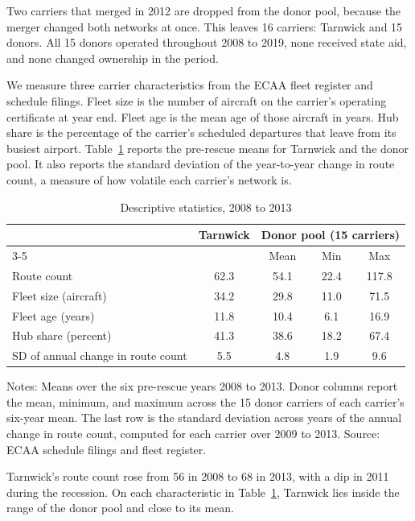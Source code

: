 \documentclass[12pt]{article}
\begin{document}
Two carriers that merged in 2012 are dropped from the donor pool, because the merger changed both networks at once. This leaves 16 carriers: Tarnwick and 15 donors. All 15 donors operated throughout 2008 to 2019, none received state aid, and none changed ownership in the period.

We measure three carrier characteristics from the ECAA fleet register and schedule filings. Fleet size is the number of aircraft on the carrier's operating certificate at year end. Fleet age is the mean age of those aircraft in years. Hub share is the percentage of the carrier's scheduled departures that leave from its busiest airport. Table~\ref{tab:desc} reports the pre-rescue means for Tarnwick and the donor pool. It also reports the standard deviation of the year-to-year change in route count, a measure of how volatile each carrier's network is.

\begin{table}[ht]
\centering
\begin{threeparttable}
\caption{Descriptive statistics, 2008 to 2013}
\label{tab:desc}
\begin{tabular}{lcccc}
\toprule
 & Tarnwick & \multicolumn{3}{c}{Donor pool (15 carriers)} \\
\cmidrule(lr){3-5}
 & & Mean & Min & Max \\
\midrule
Route count & 62.3 & 54.1 & 22.4 & 117.8 \\
Fleet size (aircraft) & 34.2 & 29.8 & 11.0 & 71.5 \\
Fleet age (years) & 11.8 & 10.4 & 6.1 & 16.9 \\
Hub share (percent) & 41.3 & 38.6 & 18.2 & 67.4 \\
SD of annual change in route count & 5.5 & 4.8 & 1.9 & 9.6 \\
\bottomrule
\end{tabular}
\begin{tablenotes}\footnotesize
\item Notes: Means over the six pre-rescue years 2008 to 2013. Donor columns report the mean, minimum, and maximum across the 15 donor carriers of each carrier's six-year mean. The last row is the standard deviation across years of the annual change in route count, computed for each carrier over 2009 to 2013. Source: ECAA schedule filings and fleet register.
\end{tablenotes}
\end{threeparttable}
\end{table}

Tarnwick's route count rose from 56 in 2008 to 68 in 2013, with a dip in 2011 during the recession. On each characteristic in Table~\ref{tab:desc}, Tarnwick lies inside the range of the donor pool and close to its mean.
\end{document}
